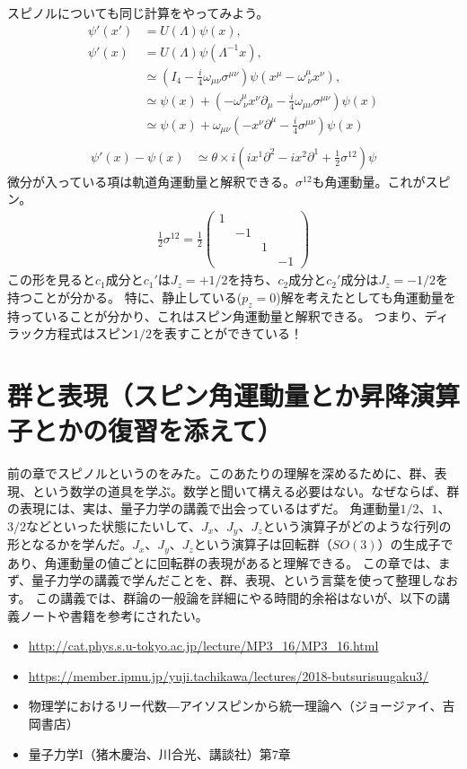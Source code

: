 \documentclass[10pt,a4paper]{jarticle}
\begin{document}
スピノルについても同じ計算をやってみよう。
\begin{align}
\psi'(x') &= U(\Lambda) \psi(x), \\
\psi'(x) &= U(\Lambda) \psi(\Lambda^{-1} x), \nonumber\\
 &\simeq \left( I_4  - \frac{i}{4} \omega_{\mu\nu} \sigma^{\mu\nu} \right) \psi(x^\mu - \omega^{\mu}_{~\nu} x^\nu), \nonumber\\
&\simeq \psi(x) + \left( - \omega^{\mu}_{~\nu} x^\nu \partial_\mu - \frac{i}{4} \omega_{\mu\nu} \sigma^{\mu\nu} \right) \psi(x) \nonumber\\
&\simeq \psi(x) + \omega_{\mu\nu} \left( - x^\nu \partial^\mu - \frac{i}{4} \sigma^{\mu\nu} \right) \psi(x) \nonumber\\
\end{align}
%
\begin{align}
\psi'(x) - \psi(x)
&\simeq
\theta \times i \left( ix^1 \partial^2 - ix^2 \partial^1 + \frac{1}{2}\sigma^{12} \right) \psi
\end{align}
%
微分が入っている項は軌道角運動量と解釈できる。$\sigma^{12}$も角運動量。これがスピン。
\begin{align}
\frac{1}{2}\sigma^{12} = \frac{1}{2} \left(\begin{array}{cccc}
1 &&&\\
& -1 &&\\
&& 1 &\\
&&& -1
\end{array}\right)
\end{align}
この形を見ると$c_1$成分と$c_1'$は$J_z = +1/2$を持ち、$c_2$成分と$c_2'$成分は$J_z = -1/2$を持つことが分かる。
特に、静止している($p_z = 0$)解を考えたとしても角運動量を持っていることが分かり、これはスピン角運動量と解釈できる。
つまり、ディラック方程式はスピン$1/2$を表すことができている！

\section{群と表現（スピン角運動量とか昇降演算子とかの復習を添えて）}
前の章でスピノルというのをみた。このあたりの理解を深めるために、群、表現、という数学の道具を学ぶ。数学と聞いて構える必要はない。なぜならば、群の表現には、実は、量子力学の講義で出会っているはずだ。
角運動量$1/2$、$1$、$3/2$などといった状態にたいして、$J_x$、$J_y$、$J_z$という演算子がどのような行列の形となるかを学んだ。$J_x$、$J_y$、$J_z$という演算子は回転群（$SO(3)$）の生成子であり、角運動量の値ごとに回転群の表現があると理解できる。
この章では、まず、量子力学の講義で学んだことを、群、表現、という言葉を使って整理しなおす。
この講義では、群論の一般論を詳細にやる時間的余裕はないが、以下の講義ノートや書籍を参考にされたい。
\begin{itemize}
\item \url{http://cat.phys.s.u-tokyo.ac.jp/lecture/MP3_16/MP3_16.html}
\item \url{https://member.ipmu.jp/yuji.tachikawa/lectures/2018-butsurisuugaku3/}
\item 物理学におけるリー代数―アイソスピンから統一理論へ（ジョージァイ、吉岡書店）
\item 量子力学I（猪木慶治、川合光、講談社）第7章
\end{itemize}
\end{document}
